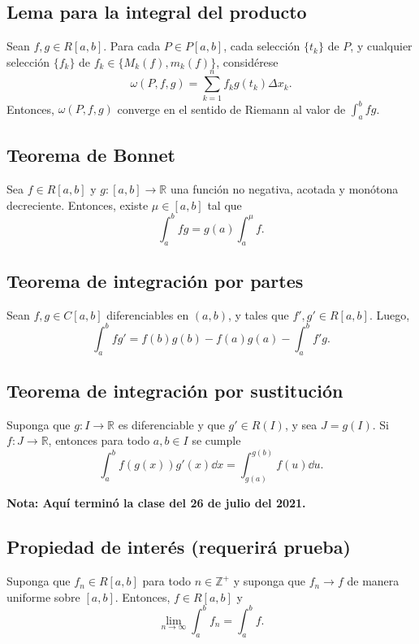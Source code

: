 \documentclass{article}
\begin{document}
\subsection*{Lema para la integral del producto}

Sean $f,g\in R[a,b]$. Para cada $P\in P[a,b]$, cada selección $\{t_k\}$ de $P$, y cualquier selección $\{f_k\}$ de $f_k\in\{M_k(f),m_k(f)\}$, considérese
$$\omega(P,f,g)=\sum_{k=1}^n f_k g(t_k)\Delta x_k.$$
Entonces, $\omega(P,f,g)$ converge en el sentido de Riemann al valor de $\displaystyle\int_a^b fg$.

\subsection*{Teorema de Bonnet}

Sea $f\in R[a,b]$ y $g:[a,b]\to\mathbb{R}$ una función no negativa, acotada y monótona decreciente. Entonces, existe $\mu\in[a,b]$ tal que
$$\int_a^b fg=g(a)\int_a^{\mu} f.$$

\subsection*{Teorema de integración por partes}

Sean $f,g\in C[a,b]$ diferenciables en $(a,b)$, y tales que $f',g'\in R[a,b]$. Luego,
$$\int_a^b fg'=f(b)g(b)-f(a)g(a)-\int_a^b f'g.$$

\subsection*{Teorema de integración por sustitución}

Suponga que $g:I\to\mathbb{R}$ es diferenciable y que $g'\in R(I)$, y sea $J=g(I)$. Si $f:J\to\mathbb{R}$, entonces para todo $a,b\in I$ se cumple
$$\int_a^b f(g(x))g'(x)\dd{x}=\int_{g(a)}^{g(b)}f(u)\dd{u}.$$

\vspace{10pt}
\textbf{Nota: Aquí terminó la clase del 26 de julio del 2021.}
\newpage

\subsection*{Propiedad de interés (requerirá prueba)}

Suponga que $f_n\in R[a,b]$ para todo $n\in\mathbb{Z}^{+}$ y suponga que $f_n\to f$ de manera uniforme sobre $[a,b]$. Entonces, $f\in R[a,b]$ y
$$\lim_{n\to\infty}\int_a^b f_n =\int_a^b f.$$
\end{document}
